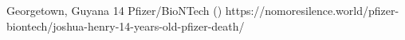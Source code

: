           {Georgetown, Guyana}
          {14}
          {Pfizer/BioNTech}
          {}
          {
             ()
          }
          {https://nomoresilence.world/pfizer-biontech/joshua-henry-14-years-old-pfizer-death/}


